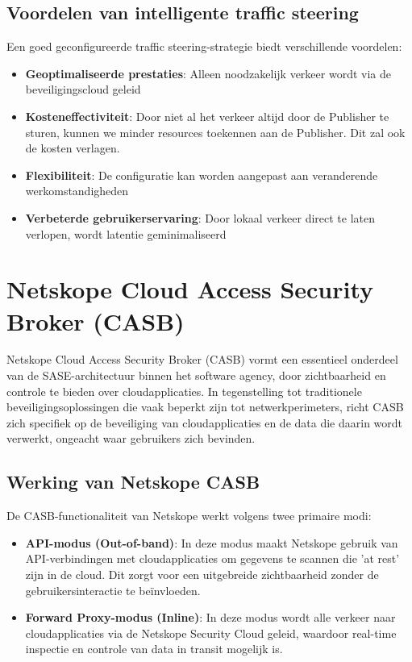 \subsection{Voordelen van intelligente traffic steering}

Een goed geconfigureerde traffic steering-strategie biedt verschillende voordelen:
\begin{itemize}
    \item \textbf{Geoptimaliseerde prestaties}: Alleen noodzakelijk verkeer wordt via de beveiligingscloud geleid
    \item \textbf{Kosteneffectiviteit}: Door niet al het verkeer altijd door de Publisher te sturen, kunnen we minder resources toekennen aan de Publisher. Dit zal ook de kosten verlagen.
    \item \textbf{Flexibiliteit}: De configuratie kan worden aangepast aan veranderende werkomstandigheden
    \item \textbf{Verbeterde gebruikerservaring}: Door lokaal verkeer direct te laten verlopen, wordt latentie geminimaliseerd
\end{itemize}


\section{Netskope Cloud Access Security Broker (CASB)}
Netskope Cloud Access Security Broker (CASB) vormt een essentieel onderdeel van de SASE-architectuur binnen het software agency, door zichtbaarheid en controle te bieden over cloudapplicaties. In tegenstelling tot traditionele beveiligingsoplossingen die vaak beperkt zijn tot netwerkperimeters, richt CASB zich specifiek op de beveiliging van cloudapplicaties en de data die daarin wordt verwerkt, ongeacht waar gebruikers zich bevinden.

\subsection{Werking van Netskope CASB}
 
De CASB-functionaliteit van Netskope werkt volgens twee primaire modi:

\begin{itemize}
    \item \textbf{API-modus (Out-of-band)}: In deze modus maakt Netskope gebruik van API-verbindingen met cloudapplicaties om gegevens te scannen die 'at rest' zijn in de cloud. Dit zorgt voor een uitgebreide zichtbaarheid zonder de gebruikersinteractie te beïnvloeden.

    \item \textbf{Forward Proxy-modus (Inline)}: In deze modus wordt alle verkeer naar cloudapplicaties via de Netskope Security Cloud geleid, waardoor real-time inspectie en controle van data in transit mogelijk is.
\end{itemize}

